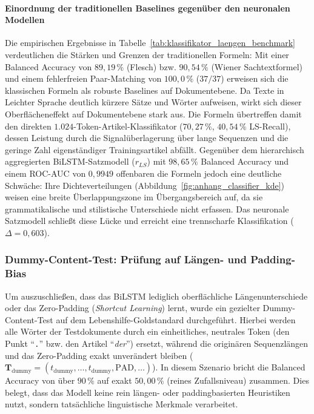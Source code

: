 \paragraph{Einordnung der traditionellen Baselines gegenüber den neuronalen Modellen}
Die empirischen Ergebnisse in Tabelle~\ref{tab:klassifikator_laengen_benchmark} verdeutlichen die Stärken und Grenzen der traditionellen Formeln: Mit einer Balanced Accuracy von $89{,}19\,\%$ (Flesch) bzw. $90{,}54\,\%$ (Wiener Sachtextformel) und einem fehlerfreien Paar-Matching von $100{,}0\,\%$ ($37/37$) erweisen sich die klassischen Formeln als robuste Baselines auf Dokumentebene. Da Texte in Leichter Sprache deutlich kürzere Sätze und Wörter aufweisen, wirkt sich dieser Oberflächeneffekt auf Dokumentebene stark aus. Die Formeln übertreffen damit den direkten $1.024$-Token-Artikel-Klassifikator ($70{,}27\,\%$, $40{,}54\,\%$ LS-Recall), dessen Leistung durch die Signalüberlagerung über lange Sequenzen und die geringe Zahl eigenständiger Trainingsartikel abfällt.
Gegenüber dem hierarchisch aggregierten BiLSTM-Satzmodell ($r_{LS}$) mit $98{,}65\,\%$ Balanced Accuracy und einem ROC-AUC von $0{,}9949$ offenbaren die Formeln jedoch eine deutliche Schwäche: Ihre Dichteverteilungen (Abbildung~\ref{fig:anhang_classifier_kde}) weisen eine breite Überlappungszone im Übergangsbereich auf, da sie grammatikalische und stilistische Unterschiede nicht erfassen. Das neuronale Satzmodell schließt diese Lücke und erreicht eine trennscharfe Klassifikation ($\Delta = 0{,}603$).
\subsubsection{Dummy-Content-Test: Prüfung auf Längen- und Padding-Bias}
\label{sec:dummy_content_test}

Um auszuschließen, dass das BiLSTM lediglich oberflächliche Längenunterschiede oder das Zero-Padding (\textit{Shortcut Learning}) lernt, wurde ein gezielter Dummy-Content-Test auf dem Lebenshilfe-Goldstandard durchgeführt. Hierbei werden alle Wörter der Testdokumente durch ein einheitliches, neutrales Token (den Punkt \enquote{\texttt{.}} bzw. den Artikel \enquote{\textit{der}}) ersetzt, während die originären Sequenzlängen und das Zero-Padding exakt unverändert bleiben ($\mathbf{T}_{\text{dummy}} = (t_{\text{dummy}}, \dots, t_{\text{dummy}}, \text{PAD}, \dots)$). In diesem Szenario bricht die Balanced Accuracy von über $90\,\%$ auf exakt $50{,}00\,\%$ (reines Zufallsniveau) zusammen. Dies belegt, dass das Modell keine rein längen- oder paddingbasierten Heuristiken nutzt, sondern tatsächliche linguistische Merkmale verarbeitet.


